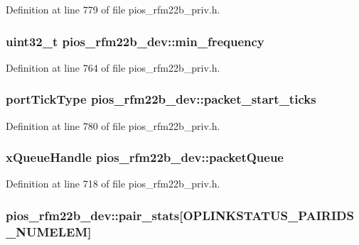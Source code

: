 \-Definition at line 779 of file pios\-\_\-rfm22b\-\_\-priv.\-h.

\hypertarget{structpios__rfm22b__dev_acfd89dda5551722d12e887369e3e6616}{
\subsubsection[{min\-\_\-frequency}]{\setlength{\rightskip}{0pt plus 5cm}uint32\-\_\-t {\bf pios\-\_\-rfm22b\-\_\-dev\-::min\-\_\-frequency}}}\label{structpios__rfm22b__dev_acfd89dda5551722d12e887369e3e6616}


\-Definition at line 764 of file pios\-\_\-rfm22b\-\_\-priv.\-h.

\hypertarget{structpios__rfm22b__dev_add7ce31439ee28ce51c07a4167666141}{
\subsubsection[{packet\-\_\-start\-\_\-ticks}]{\setlength{\rightskip}{0pt plus 5cm}port\-Tick\-Type {\bf pios\-\_\-rfm22b\-\_\-dev\-::packet\-\_\-start\-\_\-ticks}}}\label{structpios__rfm22b__dev_add7ce31439ee28ce51c07a4167666141}


\-Definition at line 780 of file pios\-\_\-rfm22b\-\_\-priv.\-h.

\hypertarget{structpios__rfm22b__dev_ab04a8d36db91686aaf0748e5db71ca0f}{
\subsubsection[{packet\-Queue}]{\setlength{\rightskip}{0pt plus 5cm}x\-Queue\-Handle {\bf pios\-\_\-rfm22b\-\_\-dev\-::packet\-Queue}}}\label{structpios__rfm22b__dev_ab04a8d36db91686aaf0748e5db71ca0f}


\-Definition at line 718 of file pios\-\_\-rfm22b\-\_\-priv.\-h.

\hypertarget{structpios__rfm22b__dev_a6db8d809d116a414eb5c7a826c833bc5}{
\subsubsection[{pair\-\_\-stats}]{ {\bf pios\-\_\-rfm22b\-\_\-dev\-::pair\-\_\-stats}\mbox{[}\-O\-P\-L\-I\-N\-K\-S\-T\-A\-T\-U\-S\-\_\-\-P\-A\-I\-R\-I\-D\-S\-\_\-\-N\-U\-M\-E\-L\-E\-M\mbox{]}}}\label{structpios__rfm22b__dev_a6db8d809d116a414eb5c7a826c833bc5}


